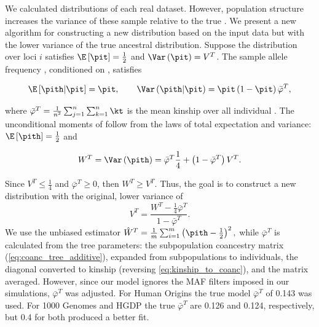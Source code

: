 \documentclass[11pt]{article}
\begin{document}
\begin{linenumbers}
We calculated \pith distributions of each real dataset.
However, population structure increases the variance of these sample \pith relative to the true \pit \citep{ochoa_estimating_2021}.
We present a new algorithm for constructing a new distribution based on the input data but with the lower variance of the true ancestral distribution.
Suppose the \pit distribution over loci $i$ satisfies $\E \left[ \pit \right] = \frac{1}{2}$ and $\Var \left( \pit \right) = V^T$.
The sample allele frequency \pith, conditioned on \pit, satisfies
\begin{linenomath*}
$$
\E \left[ \pith \middle| \pit \right]
=
\pit
, \quad\quad
\Var \left( \pith \middle| \pit \right)
=
\pit \left( 1 - \pit \right) \bar{\varphi}^T
,
$$
\end{linenomath*}
where $\bar{\varphi}^T = \frac{1}{n^2} \sum_{j=1}^n \sum_{k=1}^n \kt$ is the mean kinship over all individual \citep{ochoa_estimating_2021}.
The unconditional moments of \pith follow from the laws of total expectation and variance: 
$
\E \left[ \pith \right]
=
\frac{1}{2}
$
and
\begin{linenomath*}
\begin{equation*}
  W^T
  =
  \Var \left( \pith \right)
  =
  \bar{\varphi}^T \frac{1}{4}
  + \left( 1 - \bar{\varphi}^T \right) V^T
  .
\end{equation*}
\end{linenomath*}
Since $V^T \le \frac{1}{4}$ and $\bar{\varphi}^T \ge 0$, then $W^T \ge V^T$.
Thus, the goal is to construct a new distribution with the original, lower variance of
\begin{equation}
  \label{eq:var_undiff}
  V^T
  =
  \frac{ W^T - \frac{1}{4} \bar{\varphi}^T }{ 1 - \bar{\varphi}^T }
  .
\end{equation}
We use the unbiased estimator
$
\hat{W}^T
=
\frac{1}{m} \sum_{i=1}^m \left( \pith - \frac{1}{2} \right)^2
,
$
while $\bar{\varphi}^T$ is calculated from the tree parameters: the subpopulation coancestry matrix (\cref{eq:coanc_tree_additive}), expanded from subpopulations to individuals, the diagonal converted to kinship (reversing \cref{eq:kinship_to_coanc}), and the matrix averaged.
However, since our model ignores the MAF filters imposed in our simulations, $\bar{\varphi}^T$ was adjusted.
For Human Origins the true model $\bar{\varphi}^T$ of 0.143 was used.
For 1000 Genomes and HGDP the true $\bar{\varphi}^T$ are 0.126 and 0.124, respectively, but 0.4 for both produced a better fit.


\end{linenumbers}
\end{document}
